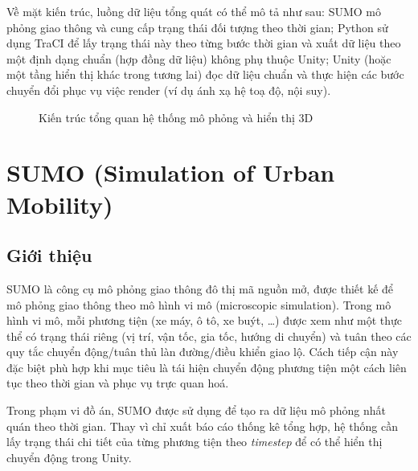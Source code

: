 \documentclass[../DoAn.tex]{subfiles}
\begin{document}
Về mặt kiến trúc, luồng dữ liệu tổng quát có thể mô tả như sau: SUMO mô phỏng giao thông và cung cấp trạng thái đối tượng theo thời gian; Python sử dụng TraCI để lấy trạng thái này theo từng bước thời gian và xuất dữ liệu theo một định dạng chuẩn (hợp đồng dữ liệu) không phụ thuộc Unity; Unity (hoặc một tầng hiển thị khác trong tương lai) đọc dữ liệu chuẩn và thực hiện các bước chuyển đổi phục vụ việc render (ví dụ ánh xạ hệ toạ độ, nội suy).

\begin{figure}[H]
	\centering
	\caption{Kiến trúc tổng quan hệ thống mô phỏng và hiển thị 3D}
	\label{fig:congnghe-architecture}
\end{figure}

\section{SUMO (Simulation of Urban Mobility)}
\subsection{Giới thiệu}
\gls{SUMO} là công cụ mô phỏng giao thông đô thị mã nguồn mở, được thiết kế để mô phỏng giao thông theo mô hình vi mô (microscopic simulation). Trong mô hình vi mô, mỗi phương tiện (xe máy, ô tô, xe buýt, \ldots) được xem như một thực thể có trạng thái riêng (vị trí, vận tốc, gia tốc, hướng di chuyển) và tuân theo các quy tắc chuyển động/tuân thủ làn đường/điều khiển giao lộ. Cách tiếp cận này đặc biệt phù hợp khi mục tiêu là tái hiện chuyển động phương tiện một cách liên tục theo thời gian và phục vụ trực quan hoá.

Trong phạm vi đồ án, SUMO được sử dụng để tạo ra dữ liệu mô phỏng nhất quán theo thời gian. Thay vì chỉ xuất báo cáo thống kê tổng hợp, hệ thống cần lấy trạng thái chi tiết của từng phương tiện theo \textit{timestep} để có thể hiển thị chuyển động trong Unity.
\end{document}
